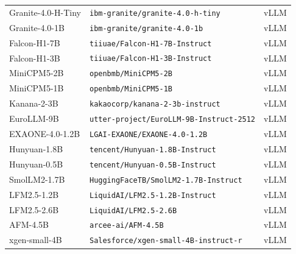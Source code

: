\begin{tabular}{lll}
Granite-4.0-H-Tiny & \texttt{\footnotesize ibm-granite/granite-4.0-h-tiny} & vLLM \\
Granite-4.0-1B & \texttt{\footnotesize ibm-granite/granite-4.0-1b} & vLLM \\
Falcon-H1-7B & \texttt{\footnotesize tiiuae/Falcon-H1-7B-Instruct} & vLLM \\
Falcon-H1-3B & \texttt{\footnotesize tiiuae/Falcon-H1-3B-Instruct} & vLLM \\
MiniCPM5-2B & \texttt{\footnotesize openbmb/MiniCPM5-2B} & vLLM \\
MiniCPM5-1B & \texttt{\footnotesize openbmb/MiniCPM5-1B} & vLLM \\
Kanana-2-3B & \texttt{\footnotesize kakaocorp/kanana-2-3b-instruct} & vLLM \\
EuroLLM-9B & \texttt{\footnotesize utter-project/EuroLLM-9B-Instruct-2512} & vLLM \\
EXAONE-4.0-1.2B & \texttt{\footnotesize LGAI-EXAONE/EXAONE-4.0-1.2B} & vLLM \\
Hunyuan-1.8B & \texttt{\footnotesize tencent/Hunyuan-1.8B-Instruct} & vLLM \\
Hunyuan-0.5B & \texttt{\footnotesize tencent/Hunyuan-0.5B-Instruct} & vLLM \\
SmolLM2-1.7B & \texttt{\footnotesize HuggingFaceTB/SmolLM2-1.7B-Instruct} & vLLM \\
LFM2.5-1.2B & \texttt{\footnotesize LiquidAI/LFM2.5-1.2B-Instruct} & vLLM \\
LFM2.5-2.6B & \texttt{\footnotesize LiquidAI/LFM2.5-2.6B} & vLLM \\
AFM-4.5B & \texttt{\footnotesize arcee-ai/AFM-4.5B} & vLLM \\
xgen-small-4B & \texttt{\footnotesize Salesforce/xgen-small-4B-instruct-r} & vLLM \\
\bottomrule
\end{tabular}
